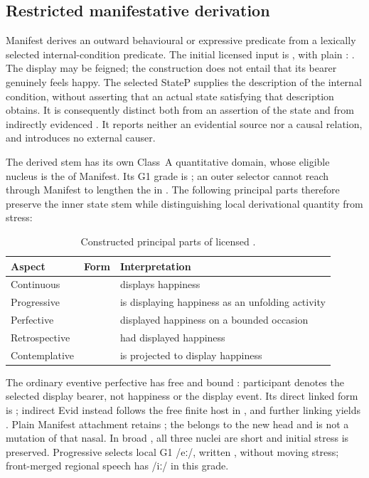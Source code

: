 \subsection{Restricted manifestative derivation}\label{sec:stative-manifest}

Manifest derives an outward behavioural or expressive predicate from a
lexically selected internal-condition predicate. The initial licensed input
is  , with plain :
 . The display may be feigned;
the construction does not entail that its bearer genuinely feels happy.
The selected StateP supplies the description of the internal condition,
without asserting that an actual state satisfying that description obtains.
It is consequently distinct both from an assertion of the state and from
indirectly evidenced . It reports neither an evidential
source nor a causal relation, and introduces no external causer.

The derived stem has its own Class~A quantitative domain, whose eligible
nucleus is the  of Manifest. Its G1 grade is ; an outer
selector cannot reach through Manifest to lengthen the  in
. The following principal parts therefore preserve the inner
state stem while distinguishing local derivational quantity from stress:

\begin{table}[htbp]
\footnotesize
\caption{Constructed principal parts of licensed .}
\label{tab:stative-manifest}
\begin{tabularx}{\textwidth}{l l L}
\toprule
Aspect & Form & Interpretation \\
\midrule
Continuous &  & displays happiness \\
Progressive &  & is displaying happiness as an unfolding activity \\
Perfective &  & displayed happiness on a bounded occasion \\
Retrospective &  & had displayed happiness \\
Contemplative &  & is projected to display happiness \\
\bottomrule
\end{tabularx}
\end{table}

The ordinary eventive perfective has free  and bound
: participant  denotes the selected display
bearer, not happiness or the display event. Its direct linked form is
; indirect Evid instead follows the free finite host in
, and further linking yields .
Plain Manifest attachment retains ; the  belongs to the
new head and is not a mutation of that nasal. In broad
, all three nuclei are
short and initial stress is preserved. Progressive
selects local G1 /eː/, written , without moving stress;
front-merged regional speech has /iː/ in this grade.

